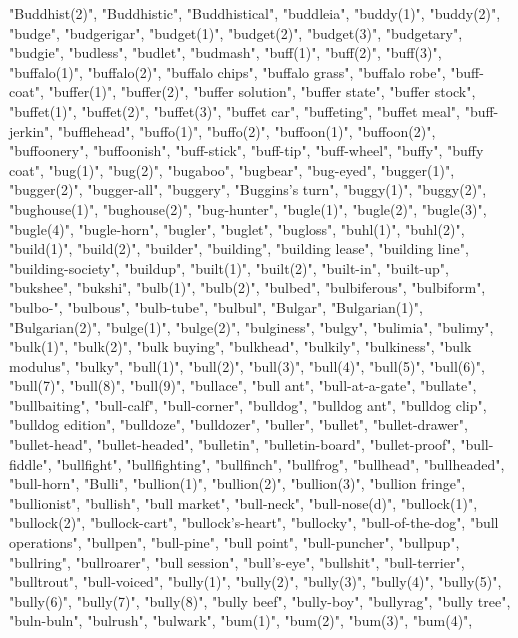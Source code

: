 "Buddhist(2)",
"Buddhistic",
"Buddhistical",
"buddleia",
"buddy(1)",
"buddy(2)",
"budge",
"budgerigar",
"budget(1)",
"budget(2)",
"budget(3)",
"budgetary",
"budgie",
"budless",
"budlet",
"budmash",
"buff(1)",
"buff(2)",
"buff(3)",
"buffalo(1)",
"buffalo(2)",
"buffalo chips",
"buffalo grass",
"buffalo robe",
"buff-coat",
"buffer(1)",
"buffer(2)",
"buffer solution",
"buffer state",
"buffer stock",
"buffet(1)",
"buffet(2)",
"buffet(3)",
"buffet car",
"buffeting",
"buffet meal",
"buff-jerkin",
"bufflehead",
"buffo(1)",
"buffo(2)",
"buffoon(1)",
"buffoon(2)",
"buffoonery",
"buffoonish",
"buff-stick",
"buff-tip",
"buff-wheel",
"buffy",
"buffy coat",
"bug(1)",
"bug(2)",
"bugaboo",
"bugbear",
"bug-eyed",
"bugger(1)",
"bugger(2)",
"bugger-all",
"buggery",
"Buggins's turn",
"buggy(1)",
"buggy(2)",
"bughouse(1)",
"bughouse(2)",
"bug-hunter",
"bugle(1)",
"bugle(2)",
"bugle(3)",
"bugle(4)",
"bugle-horn",
"bugler",
"buglet",
"bugloss",
"buhl(1)",
"buhl(2)",
"build(1)",
"build(2)",
"builder",
"building",
"building lease",
"building line",
"building-society",
"buildup",
"built(1)",
"built(2)",
"built-in",
"built-up",
"bukshee",
"bukshi",
"bulb(1)",
"bulb(2)",
"bulbed",
"bulbiferous",
"bulbiform",
"bulbo-",
"bulbous",
"bulb-tube",
"bulbul",
"Bulgar",
"Bulgarian(1)",
"Bulgarian(2)",
"bulge(1)",
"bulge(2)",
"bulginess",
"bulgy",
"bulimia",
"bulimy",
"bulk(1)",
"bulk(2)",
"bulk buying",
"bulkhead",
"bulkily",
"bulkiness",
"bulk modulus",
"bulky",
"bull(1)",
"bull(2)",
"bull(3)",
"bull(4)",
"bull(5)",
"bull(6)",
"bull(7)",
"bull(8)",
"bull(9)",
"bullace",
"bull ant",
"bull-at-a-gate",
"bullate",
"bullbaiting",
"bull-calf",
"bull-corner",
"bulldog",
"bulldog ant",
"bulldog clip",
"bulldog edition",
"bulldoze",
"bulldozer",
"buller",
"bullet",
"bullet-drawer",
"bullet-head",
"bullet-headed",
"bulletin",
"bulletin-board",
"bullet-proof",
"bull-fiddle",
"bullfight",
"bullfighting",
"bullfinch",
"bullfrog",
"bullhead",
"bullheaded",
"bull-horn",
"Bulli",
"bullion(1)",
"bullion(2)",
"bullion(3)",
"bullion fringe",
"bullionist",
"bullish",
"bull market",
"bull-neck",
"bull-nose(d)",
"bullock(1)",
"bullock(2)",
"bullock-cart",
"bullock's-heart",
"bullocky",
"bull-of-the-dog",
"bull operations",
"bullpen",
"bull-pine",
"bull point",
"bull-puncher",
"bullpup",
"bullring",
"bullroarer",
"bull session",
"bull's-eye",
"bullshit",
"bull-terrier",
"bulltrout",
"bull-voiced",
"bully(1)",
"bully(2)",
"bully(3)",
"bully(4)",
"bully(5)",
"bully(6)",
"bully(7)",
"bully(8)",
"bully beef",
"bully-boy",
"bullyrag",
"bully tree",
"buln-buln",
"bulrush",
"bulwark",
"bum(1)",
"bum(2)",
"bum(3)",
"bum(4)",
